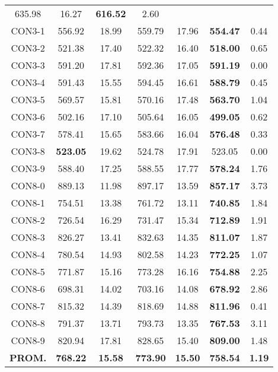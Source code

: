 \begin{table}[ht]
\begin{tabular}{c c c c c c c}
635.98 & 16.27 & \bf{616.52} & 
2.60\\CON3-1 & 556.92 & 18.99 & 
559.79 & 17.96 & \bf{554.47} & 
0.44\\CON3-2 & 521.38 & 17.40 & 
522.32 & 16.40 & \bf{518.00} & 
0.65\\CON3-3 & 591.20 & 17.81 & 
592.36 & 17.05 & \bf{591.19} & 
0.00\\CON3-4 & 591.43 & 15.55 & 
594.45 & 16.61 & \bf{588.79} & 
0.45\\CON3-5 & 569.57 & 15.81 & 
570.16 & 17.48 & \bf{563.70} & 
1.04\\CON3-6 & 502.16 & 17.10 & 
505.64 & 16.05 & \bf{499.05} & 
0.62\\CON3-7 & 578.41 & 15.65 & 
583.66 & 16.04 & \bf{576.48} & 
0.33\\CON3-8 & \bf{523.05} & 19.62 & 
524.78 & 17.91 & 523.05 & 0.00\\
CON3-9 & 588.40 & 17.25 & 
588.55 & 17.77 & \bf{578.24} & 
1.76\\CON8-0 & 889.13 & 11.98 & 
897.17 & 13.59 & \bf{857.17} & 
3.73\\CON8-1 & 754.51 & 13.38 & 
761.72 & 13.11 & \bf{740.85} & 
1.84\\CON8-2 & 726.54 & 16.29 & 
731.47 & 15.34 & \bf{712.89} & 
1.91\\CON8-3 & 826.27 & 13.41 & 
832.63 & 14.35 & \bf{811.07} & 
1.87\\CON8-4 & 780.54 & 14.93 & 
802.58 & 14.23 & \bf{772.25} & 
1.07\\CON8-5 & 771.87 & 15.16 & 
773.28 & 16.16 & \bf{754.88} & 
2.25\\CON8-6 & 698.31 & 14.02 & 
703.16 & 14.08 & \bf{678.92} & 
2.86\\CON8-7 & 815.32 & 14.39 & 
818.69 & 14.88 & \bf{811.96} & 
0.41\\CON8-8 & 791.37 & 13.71 & 
793.73 & 13.35 & \bf{767.53} & 
3.11\\CON8-9 & 820.94 & 17.81 & 
828.65 & 15.40 & \bf{809.00} & 
1.48\\\bf{PROM.} & 
\bf{768.22} & \bf{15.58} & \bf{773.90} & \bf{15.50} & \bf{758.54} & \bf{1.19}\\[1ex]\hline
\end{tabular}
\label{table:nonlin}
\end{table} \clearpage
